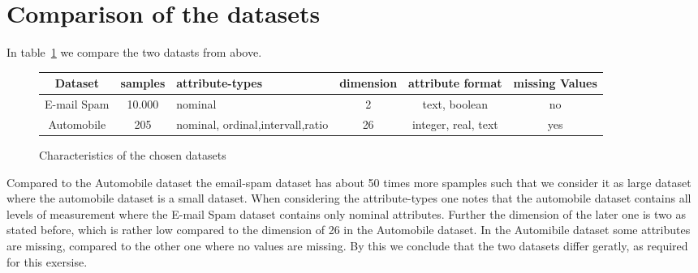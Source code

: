 \documentclass[11pt]{article}
\begin{document}
\section{Comparison of the datasets}
%
In table~\ref{tab::1} we compare the two datasts from above.
%
\begin{figure}[h]
  \begin{tabular}{ | c | c | p{2.5cm} | c | c | c |}
    \hline
    Dataset     & samples & attribute-types                       & dimension  & attribute format    & missing Values \\
    \hline
    E-mail Spam & 10.000  & nominal                          & 2          & text, boolean       & no \\
    \hline
    Automobile  & 205     & nominal, ordinal,intervall,ratio & 26         & integer, real, text & yes \\
    \hline
  \end{tabular}
    \caption{Characteristics of the chosen datasets}
    \label{tab::1}
  \end{figure}
%
Compared to the Automobile dataset the email-spam dataset has about 50 times more spamples such that we consider it as large dataset where the automobile dataset is a small dataset. When considering the attribute-types one notes that the automobile dataset contains all levels of measurement where the E-mail Spam dataset contains only nominal attributes. Further the dimension of the later one is two as stated before, which is rather low compared to the dimension of 26 in the Automobile dataset. In the Automibile dataset some attributes are missing, compared to the other one where no values are missing. 
By this we conclude that the two datasets differ geratly, as required for this exersise.
\newpage


\end{document}
